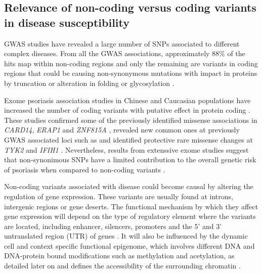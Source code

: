 \subsection{Relevance of non-coding versus coding variants in disease susceptibility}

GWAS studies have revealed a large number of SNPs associated to different complex diseases. From all the GWAS associations, approximately 88\% of the hits map within non-coding regions \parencite{Welter2013} and only the remaining are variants in coding regions that could be causing non-synonymous mutations with impact in proteins by truncation or alteration in folding or glycosylation \parencite{Welter2013}. 


Exome psoriasis association studies in Chinese and Caucasian populations have increased the number of coding variants with putative effect in protein coding \parencite{Tang2014,Zuo2015,Dand2017}. These studies confirmed some of the previously identified missense associations in \textit{CARD14}, \textit{ERAP1} and \textit{ZNF815A} \parencite{Tang2014}, revealed new common ones at previously GWAS associated loci such as  and identified protective rare missense changes at \textit{TYK2} and \textit{IFIH1} \parencite{Dand2017}. Nevertheless, results from extenssive exome studies suggest that non-synonimous SNPs have a limited contribution to the overall genetic risk of psoriasis when compared to non-coding variants \parencite{Tang2014}.

Non-coding variants associated with disease could become causal by altering the regulation of gene expression. These variants are usually found at introns, intergenic regions or gene deserts. The functional mechanism by which they affect gene expression will depend on the type of regulatory element where the variants are located, including enhancer, silencers, promoters and the 5' and 3' untranslated region (UTR) of genes \parencite{Ward2012}. It will also be influenced by the dynamic cell and context specific functional epigenome, which involves different DNA and DNA-protein bound modifications such as methylation and acetylation, as detailed later on and defines the accessibility of the surrounding chromatin \parencite{Knight2014}.

